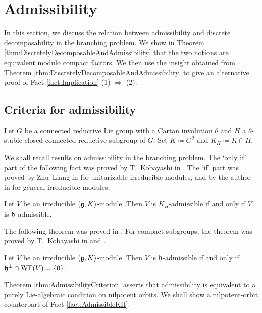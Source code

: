

\section{Admissibility} \label{section:Admissibility}

In this section, we discuss the relation between admissibility and discrete decomposability in the branching problem.
We show in Theorem \ref{thm:DiscretelyDecomposableAndAdmissibility} that the two notions are equivalent modulo compact factors.
We then use the insight obtained from Theorem \ref{thm:DiscretelyDecomposableAndAdmissibility} to give an alternative proof of Fact \ref{fact:Implication} (1) $\Rightarrow$ (2).

\subsection{Criteria for admissibility}

Let $G$ be a connected reductive Lie group with a Cartan involution $\theta$ and $H$ a $\theta$-stable closed connected reductive subgroup of $G$.
Set $K\coloneq G^\theta$ and $K_H \coloneq K \cap H$.

We shall recall results on admissibility in the branching problem.
The `only if' part of the following fact was proved by T.\ Kobayashi in \cite[Proposition 1.6]{Ko98_discrete_decomposable_3}.
The `if' part was proved by Zhu--Liang in \cite{ZhLi10} for unitarizable irreducible modules, and by the author in \cite{Ki24} for general irreducible modules.

\begin{fact} \label{fact:AdmissibleKH}
	Let $V$ be an irreducible $(\mathfrak{g}, K)$-module.
	Then $V$ is $K_H$-admissible if and only if $V$ is $\mathfrak{h}$-admissible.
\end{fact}

The following theorem was proved in \cite[Theorem 20]{Ki24}.
For compact subgroups, the theorem was proved by T.\ Kobayashi in \cite[Theorem 2.9]{Ko98_discrete_decomposable_2} and \cite[Theorem 1.1]{Ko19_admissible}.

\begin{theorem} \label{thm:AdmissibilityCriterion}
	Let $V$ be an irreducible $(\mathfrak{g}, K)$-module.
	Then $V$ is $\mathfrak{h}$-admissible if and only if $\mathfrak{h}^\perp \cap \mathrm{WF}(V) = \left\{0 \right\}$.
\end{theorem}

Theorem \ref{thm:AdmissibilityCriterion} asserts that admissibility is equivalent to a purely Lie-algebraic condition on nilpotent orbits.
We shall show a nilpotent-orbit counterpart of Fact \ref{fact:AdmissibleKH}.


